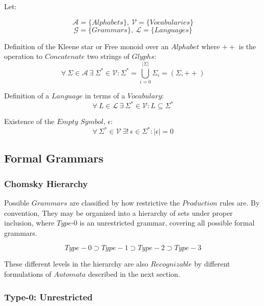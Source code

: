\documentclass{article}
\begin{document}
Let:

\[
    \mathcal{A} = \{ Alphabets \},\: \mathcal{V} = \{ Vocabularies \}
\] \[
    \mathcal{G} = \{ Grammars \},\: \mathcal{L} = \{ Languages \}
\]

    \begin{description}

    \item Definition of the Kleene star or Free monoid over an
      $Alphabet$ where $++$ is the operation to $Concatenate$ two
      strings of $Glyphs$:
    \[
        \forall \: \Sigma \in \mathcal{A} \:
        \exists \: \Sigma^* \in \mathcal{V}
        : \Sigma^* = \bigcup_{i=0}^{|\Sigma|} \Sigma_i
        = (\Sigma,++)
    \]

    \item Definition of a $Language$ in terms of a $Vocabulary$:
    \[
        \forall \: L \in \mathcal{L} \:
        \exists \: \Sigma^* \in \mathcal{V}
        : L \subseteq \Sigma^*
    \]

    \item Existence of the $Empty$ $Symbol$, $\epsilon$:
    \[
        \forall \: \Sigma^* \in \mathcal{V} \:
        \exists ! \: \epsilon \in \Sigma^*
        : |\epsilon|=0
    \]

    \end{description}

\subsection{Formal Grammars}

\subsubsection{Chomsky Hierarchy}

Possible $Grammars$ are classified by how restrictive the $Production$
rules are. By convention, They may be organized into a hierarchy of
sets under proper inclusion, where $Type$-$0$ is an unrestricted
grammar, covering all possible formal grammars.

\[
    Type-0 \supset Type-1 \supset Type-2 \supset Type-3
\]

 These different levels in the hierarchy are also $Recognizable$ by
 different formulations of $Automata$ described in the next section.

\subsubsection{Type-0: Unrestricted}
\end{document}
